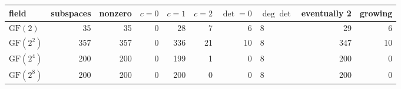 \begin{tabular}{@{}lrrrrrrlrr@{}}
\toprule
field & subspaces & nonzero & $c=0$ & $c=1$ & $c=2$ & $\det=0$ & $\deg\det$ & eventually 2 & growing\\
\midrule
$\mathrm{GF}(2)$ & 35 & 35 & 0 & 28 & 7 & 6 & $8$ & 29 & 6\\
$\mathrm{GF}(2^2)$ & 357 & 357 & 0 & 336 & 21 & 10 & $8$ & 347 & 10\\
$\mathrm{GF}(2^4)$ & 200 & 200 & 0 & 199 & 1 & 0 & $8$ & 200 & 0\\
$\mathrm{GF}(2^8)$ & 200 & 200 & 0 & 200 & 0 & 0 & $8$ & 200 & 0\\
\bottomrule
\end{tabular}
